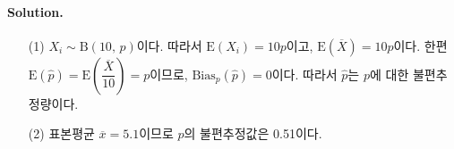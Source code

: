 \paragraph{Solution.}
\begin{itemize}
    \item[(1)] {
        $X_i \sim \mathrm{B}\left(10,\,p\right)$이다. 따라서 $\mathrm{E}\left(X_i\right)=10p$이고, $\mathrm{E}\left(\overline{X}\right)=10p$이다.
        한편 $\mathrm{E}\left(\hat{p}\right)=\mathrm{E}\left(\dfrac{\overline{X}}{10}\right)=p$이므로, $\mathrm{Bias}_p\left(\hat{p}\right)=0$이다.
        따라서 $\hat{p}$는 $p$에 대한 불편추정량이다.
    }
    \item[(2)] {
        표본평균 $\overline{x}=5.1$이므로 $p$의 불편추정값은 0.51이다.
    }
\end{itemize}